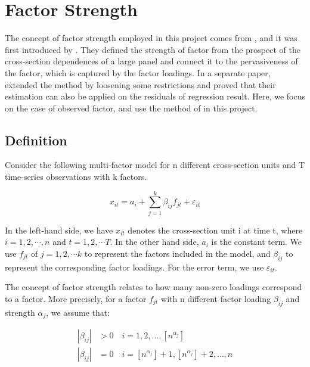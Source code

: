 \chapter{Factor Strength}\label{strength}
The concept of factor strength employed in this project comes from , and it was first introduced by .
They defined the strength of factor from the prospect of the cross-section dependences of a large panel and connect it to the pervasiveness of the factor, which is captured by the factor loadings.
In a separate paper,  extended the method by loosening some restrictions and proved that their estimation can also be applied on the residuals of regression result.
Here, we focus on the case of observed factor, and use the method of  in this project.

\section{Definition}\label{strength_definiton}
Consider the following multi-factor model for n different cross-section units and T time-series observations with k  factors.

\[  x_{it} = a_{i}+  \sum_{j=1}^{k}\beta_{ij}f_{jt} + \varepsilon_{it} \tag{1}\label{definition_model} \]

In the left-hand side, we have $x_{it}$ denotes the cross-section unit i at time t, where $i = 1, 2, \cdots, n$ and $t = 1,2, \cdots T$.  
In the other hand side, $a_{i}$ is the constant term.
We use $f_{jt}$ of $j = 1, 2, \cdots k$ to represent the factors included in the model, and $\beta_{ij}$ to represent the corresponding factor loadings.
For the error term, we use $\varepsilon_{it}$.

The concept of factor strength relates to how many non-zero loadings correspond to a factor.
More precisely, for a factor $f_{jt}$ with n different factor loading $\beta_{ij}$ and strength $\alpha_j$, we assume that:

\begin{align*}
|\beta_{ij}| &> 0\quad i = 1, 2,  \dots, [n^{\alpha_j}]\\
|\beta_{ij}| &= 0 \quad i = [n^{\alpha_j}] + 1, [n^{\alpha_j}] +2 ,\dots, n
\end{align*}

